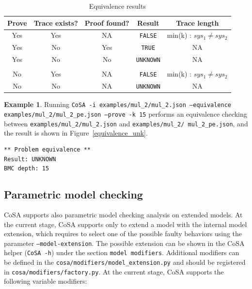 \documentclass{article}
\theoremstyle{definition}
\newtheorem{example}{Example}[section]
\begin{document}
\begin{table}[h]
  \centering
\begin{tabular}{ c c c | c c }
  Prove & Trace exists? & Proof found? & Result & Trace length \\ \hline
  Yes & Yes & NA & \texttt{FALSE} & min(k) : $sys_1 \neq sys_2$  \\
  Yes & No & Yes & \texttt{TRUE} & NA  \\
  Yes & No & No & \texttt{UNKNOWN} & NA  \\ \\
  No & Yes & NA & \texttt{FALSE} & min(k) : $sys_1 \neq sys_2$  \\
  No & No & NA & \texttt{UNKNOWN} & NA  \\
\end{tabular}
\caption{Equivalence results}
\label{tab:equivalence_results}
\end{table}


\begin{example}
  Running \texttt{CoSA -i examples/mul\_2/mul\_2.json --equivalence
    examples/mul\_2/mul\_2\_pe.json --prove -k 15} performs an
  equivalence checking between \texttt{examples/mul\_2/mul\_2.json}
  and \texttt{examples/mul\_2/
    mul\_2\_pe.json}, and the result is
  shown in Figure~\ref{equivalence_unk}.

\begin{lstlisting}[frame=single,language=ets,caption=Equivalence example (UNKNOWN),label=equivalence_unk]
** Problem equivalence **
Result: UNKNOWN
BMC depth: 15
\end{lstlisting}

\end{example}

\subsection{Parametric model checking}

CoSA supports also parametric model checking analysis on extended
models. At the current stage, CoSA supports only to extend a model
with the internal model extension, which requires to select one of the
possible faulty behaviors using the parameter
\texttt{--model-extension}. The possible extension can be shown in the
CoSA helper (\texttt{CoSA -h}) under the section \texttt{model
  modifiers}. Additional modifiers can be defined in the
\texttt{cosa/modifiers/model\_extension.py} and should be registered
in \texttt{cosa/modifiers/factory.py}. At the current stage, CoSA
supports the following variable modifiers:
\end{document}

